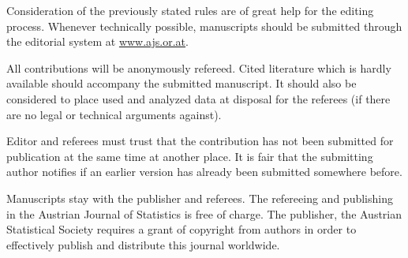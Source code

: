 \documentclass[article]{ajs}
\begin{document}
Consideration of the previously stated rules are of great help for
the editing process. Whenever technically possible, manuscripts
should be submitted through the editorial system at \href{www.ajs.or.at}{www.ajs.or.at}.

All contributions will be anonymously refereed. Cited literature which is
hardly available should accompany the submitted manuscript. It
should also be considered to place used and analyzed data at
disposal for the referees (if there are no legal or technical
arguments against).

Editor and referees must trust that the contribution has not been
submitted for publication at the same time at another place. It is
fair that the submitting author notifies if an earlier version has
already been submitted somewhere before.

Manuscripts stay with the publisher and referees. The refereeing
and publishing in the Austrian Journal of Statistics is free of
charge. The publisher, the Austrian Statistical Society requires a
grant of copyright from authors in order to effectively publish
and distribute this journal worldwide.

%

\end{document}
